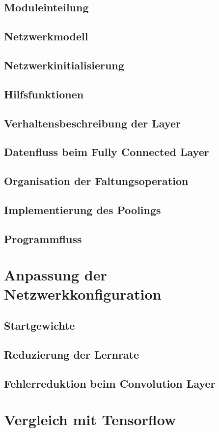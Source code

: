 \documentclass[../main.tex]{subfiles}
\begin{document}
\subsection{Moduleinteilung}

\subsection{Netzwerkmodell}

\subsection{Netzwerkinitialisierung}

\subsection{Hilfsfunktionen}

\subsection{Verhaltensbeschreibung der Layer}

\subsection{Datenfluss beim Fully Connected Layer}

\subsection{Organisation der Faltungsoperation}

\subsection{Implementierung des Poolings}

\subsection{Programmfluss}



\section{Anpassung der Netzwerkkonfiguration}

\subsection{Startgewichte}

\subsection{Reduzierung der Lernrate}

\subsection{Fehlerreduktion beim Convolution Layer}


\section{Vergleich mit Tensorflow}
\end{document}
